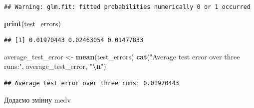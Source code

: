 \documentclass[
]{article}
\newenvironment{Shaded}{\begin{snugshade}}{\end{snugshade}}
\newcommand{\AttributeTok}[1]{\textcolor[rgb]{0.13,0.29,0.53}{#1}}
\newcommand{\ControlFlowTok}[1]{\textcolor[rgb]{0.13,0.29,0.53}{\textbf{#1}}}
\newcommand{\DecValTok}[1]{\textcolor[rgb]{0.00,0.00,0.81}{#1}}
\newcommand{\FloatTok}[1]{\textcolor[rgb]{0.00,0.00,0.81}{#1}}
\newcommand{\FunctionTok}[1]{\textcolor[rgb]{0.13,0.29,0.53}{\textbf{#1}}}
\newcommand{\NormalTok}[1]{#1}
\newcommand{\OtherTok}[1]{\textcolor[rgb]{0.56,0.35,0.01}{#1}}
\newcommand{\SpecialCharTok}[1]{\textcolor[rgb]{0.81,0.36,0.00}{\textbf{#1}}}
\newcommand{\StringTok}[1]{\textcolor[rgb]{0.31,0.60,0.02}{#1}}
\begin{document}
\begin{verbatim}
## Warning: glm.fit: fitted probabilities numerically 0 or 1 occurred
\end{verbatim}

\begin{Shaded}
\begin{Highlighting}[]
\FunctionTok{print}\NormalTok{(test\_errors)}
\end{Highlighting}
\end{Shaded}

\begin{verbatim}
## [1] 0.01970443 0.02463054 0.01477833
\end{verbatim}

\begin{Shaded}
\begin{Highlighting}[]
\NormalTok{average\_test\_error }\OtherTok{\textless{}{-}} \FunctionTok{mean}\NormalTok{(test\_errors)}
\FunctionTok{cat}\NormalTok{(}\StringTok{"Average test error over three runs:"}\NormalTok{, average\_test\_error, }\StringTok{"}\SpecialCharTok{\textbackslash{}n}\StringTok{"}\NormalTok{)}
\end{Highlighting}
\end{Shaded}

\begin{verbatim}
## Average test error over three runs: 0.01970443
\end{verbatim}

Додаємо змінну medv

\begin{Shaded}
\end{Shaded}
\end{document}
